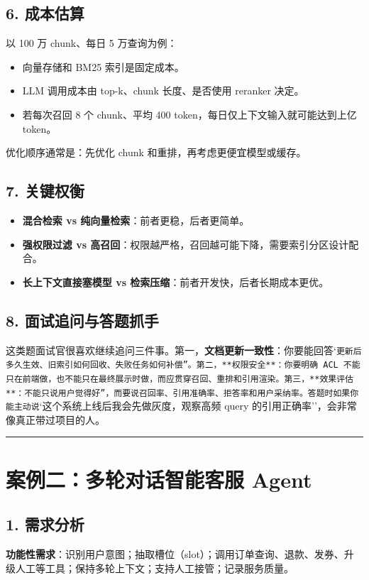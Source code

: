 \subsection{6. 成本估算}
以 100 万 chunk、每日 5 万查询为例：

\begin{itemize}[leftmargin=2em]
\item 向量存储和 BM25 索引是固定成本。
\item LLM 调用成本由 top-k、chunk 长度、是否使用 reranker 决定。
\item 若每次召回 8 个 chunk、平均 400 token，每日仅上下文输入就可能达到上亿 token。
\end{itemize}
优化顺序通常是：先优化 chunk 和重排，再考虑更便宜模型或缓存。


\subsection{7. 关键权衡}
\begin{itemize}[leftmargin=2em]
\item \textbf{混合检索 vs 纯向量检索}：前者更稳，后者更简单。
\item \textbf{强权限过滤 vs 高召回}：权限越严格，召回越可能下降，需要索引分区设计配合。
\item \textbf{长上下文直接塞模型 vs 检索压缩}：前者开发快，后者长期成本更优。
\end{itemize}

\subsection{8. 面试追问与答题抓手}
这类题面试官很喜欢继续追问三件事。第一，\textbf{文档更新一致性}：你要能回答`\texttt{更新后多久生效、旧索引如何回收、失败任务如何补偿''。第二，**权限安全**：你要明确 ACL 不能只在前端做，也不能只在最终展示时做，而应贯穿召回、重排和引用渲染。第三，**效果评估**：不能只说}\texttt{用户觉得好''，而要说召回率、引用准确率、拒答率和用户采纳率。答题时如果你能主动说}`这个系统上线后我会先做灰度，观察高频 query 的引用正确率''，会非常像真正带过项目的人。


\bigskip\hrule\bigskip

\section{案例二：多轮对话智能客服 Agent}

\subsection{1. 需求分析}
\textbf{功能性需求}：识别用户意图；抽取槽位（slot）；调用订单查询、退款、发券、升级人工等工具；保持多轮上下文；支持人工接管；记录服务质量。


